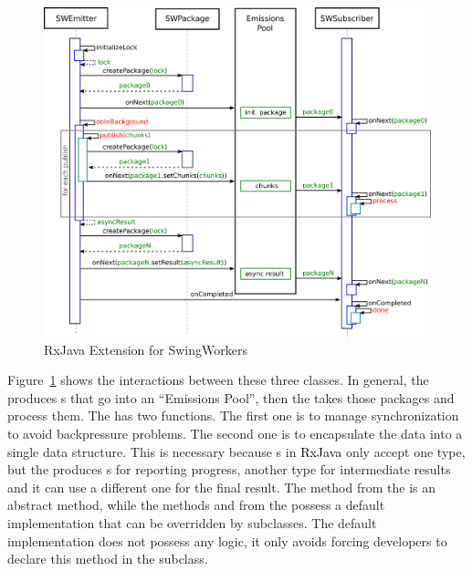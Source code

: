 \documentclass[type=bsc,accentcolor=tud9c]{tudthesis}
\newcommand{\framework}[1]{\textcolor{black}{#1}}
\begin{document}
\begin{figure}[h]
\begin{center}
\includegraphics[width=17cm]{design/rxjava-extension.png}
\end{center}
\caption{RxJava Extension for SwingWorkers}
\label{fig:rxjava-extension}
\end{figure}

Figure~\ref{fig:rxjava-extension} shows the interactions between these three classes. In general, the  produces s that go into an ``Emissions Pool'', then the  takes those packages and process them. The  has two functions. The first one is to manage synchronization to avoid backpressure problems. The second one is to encapsulate the data into a single data structure. This is necessary because s in \framework{RxJava} only accept one type, but the  produces s for reporting progress, another type for intermediate results and it can use a different one for the final result. The method  from the  is an abstract method, while the methods  and  from the  possess a default implementation that can be overridden by subclasses. The default implementation does not possess any logic, it only avoids forcing developers to declare this method in the subclass.
\end{document}
